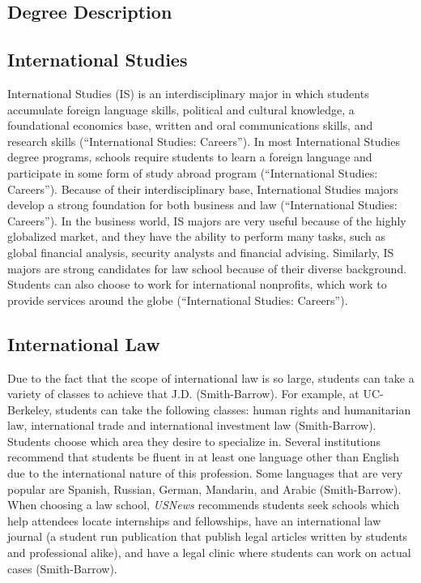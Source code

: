 \begin{multicols}{2}

\section{Degree Description}
    \subsection{International Studies}
        International Studies (IS) is an interdisciplinary major in which students accumulate foreign language skills, political and cultural knowledge, a foundational economics base, written and oral communications skills, and research skills (“International Studies: Careers”). In most International Studies degree programs, schools require students to learn a foreign language and participate in some form of study abroad program (“International Studies: Careers”). Because of their interdisciplinary base, International Studies majors develop a strong foundation for both business and law (“International Studies: Careers”). In the business world, IS majors are very useful because of the highly globalized market, and they have the ability to perform many tasks, such as global financial analysis, security analysts and financial advising. Similarly, IS majors are strong candidates for law school because of their diverse background. Students can also choose to work for international nonprofits, which work to provide services around the globe (“International Studies: Careers”). 
    \subsection{International Law}
        Due to the fact that the scope of international law is so large, students can take a variety of classes to achieve that J.D. (Smith-Barrow). For example, at UC-Berkeley, students can take the following classes: human rights and humanitarian law, international trade and international investment law (Smith-Barrow). Students choose which area they desire to specialize in. Several institutions recommend that students be fluent in at least one language other than English due to the international nature of this profession. Some languages that are very popular are Spanish, Russian, German, Mandarin, and Arabic (Smith-Barrow). When choosing a law school, \textit{USNews} recommends students seek schools which help attendees locate internships and fellowships, have an international law journal (a student run publication that publish legal articles written by students and professional alike), and have a legal clinic where students can work on actual cases (Smith-Barrow). 


\end{multicols}
